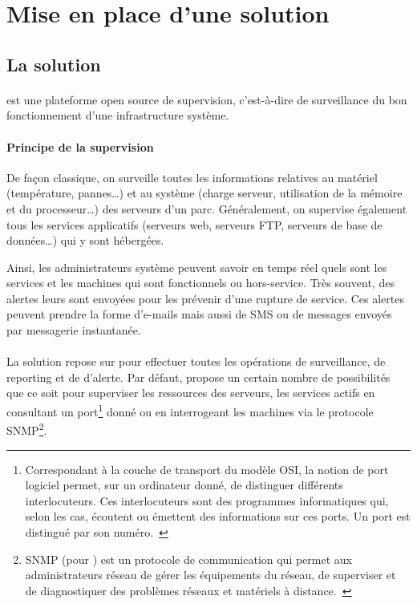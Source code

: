 \section{Mise en place d'une solution \acentreon{}}

\subsection{La solution \acentreon}

\paragraph{}
\acentreon{} est une plateforme open source de supervision, c'est-à-dire de surveillance du bon fonctionnement d'une infrastructure système.

\paragraph{Principe de la supervision}
De façon classique, on surveille toutes les informations relatives au matériel (température, pannes\ldots) et au système (charge serveur, utilisation de la mémoire et du processeur\ldots) des serveurs d'un parc.
Généralement, on supervise également tous les services applicatifs (serveurs web, serveurs FTP, serveurs de base de données\ldots) qui y sont hébergées.

Ainsi, les administrateurs système peuvent savoir en temps réel quels sont les services et les machines qui sont fonctionnels ou hors-service.
Très souvent, des alertes leurs sont envoyées pour les prévenir d'une rupture de service.
Ces alertes peuvent prendre la forme d'e-mails mais aussi de SMS ou de messages envoyés par messagerie instantanée.

\paragraph{\anagios}
La solution \acentreon{} repose sur \anagios{} pour effectuer toutes les opérations de surveillance, de reporting et de d'alerte.
Par défaut, \anagios{} propose un certain nombre de possibilités que ce soit pour superviser les ressources des serveurs, les services actifs en consultant un port\footnote{Correspondant à la couche de transport du modèle OSI, la notion de port logiciel permet, sur un ordinateur donné, de distinguer différents interlocuteurs. Ces interlocuteurs sont des programmes informatiques qui, selon les cas, écoutent ou émettent des informations sur ces ports. Un port est distingué par son numéro.~\cite{port}} donné ou en interrogeant les machines via le protocole SNMP\footnote{SNMP (pour ) est un protocole de communication qui permet aux administrateurs réseau de gérer les équipements du réseau, de superviser et de diagnostiquer des problèmes réseaux et matériels à distance.~\cite{snmp}}.

